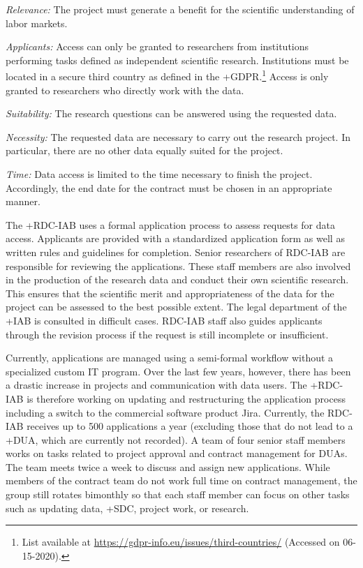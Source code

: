 \documentclass[
]{book}
\begin{document}
\emph{Relevance:} The project must generate a benefit for the scientific understanding of labor markets.

\emph{Applicants:} Access can only be granted to researchers from institutions performing tasks defined as independent scientific research. Institutions must be located in a secure third country as defined in the +GDPR\textbar.\footnote{List available at \url{https://gdpr-info.eu/issues/third-countries/} (Accessed on 06-15-2020).} Access is only granted to researchers who directly work with the data.

\emph{Suitability:} The research questions can be answered using the requested data.

\emph{Necessity:} The requested data are necessary to carry out the research project. In particular, there are no other data equally suited for the project.

\emph{Time:} Data access is limited to the time necessary to finish the project. Accordingly, the end date for the contract must be chosen in an appropriate manner.

The +RDC-IAB\textbar{} uses a formal application process to assess requests for data access. Applicants are provided with a standardized application form as well as written rules and guidelines for completion. Senior researchers of RDC-IAB are responsible for reviewing the applications. These staff members are also involved in the production of the research data and conduct their own scientific research. This ensures that the scientific merit and appropriateness of the data for the project can be assessed to the best possible extent. The legal department of the +IAB\textbar{} is consulted in difficult cases. RDC-IAB staff also guides applicants through the revision process if the request is still incomplete or insufficient.

Currently, applications are managed using a semi-formal workflow without a specialized custom IT program. Over the last few years, however, there has been a drastic increase in projects and communication with data users. The +RDC-IAB\textbar{} is therefore working on updating and restructuring the application process including a switch to the commercial software product Jira. Currently, the RDC-IAB receives up to 500 applications a year (excluding those that do not lead to a +DUA\textbar, which are currently not recorded). A team of four senior staff members works on tasks related to project approval and contract management for DUAs. The team meets twice a week to discuss and assign new applications. While members of the contract team do not work full time on contract management, the group still rotates bimonthly so that each staff member can focus on other tasks such as updating data, +SDC\textbar, project work, or research.
\end{document}
